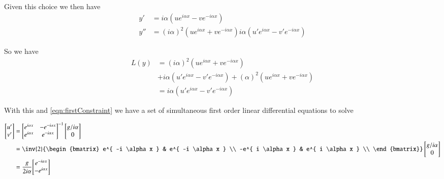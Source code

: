 \documentclass{article}
\begin{document}
Given this choice we then have
\begin{align*}
y' &= i \alpha (u e^{ i \alpha x } - v e^{ -i \alpha x }) \\
y'' &= 
(i \alpha)^2 (u e^{ i \alpha x } + v e^{ -i \alpha x }) 
i \alpha (u' e^{ i \alpha x } - v' e^{ -i \alpha x }) 
\end{align*}

So we have
\begin{align*}
L(y) 
&=
(i \alpha)^2 (u e^{ i \alpha x } + v e^{ -i \alpha x })  \\
&+i \alpha (u' e^{ i \alpha x } - v' e^{ -i \alpha x }) 
+ (\alpha)^2 (u e^{ i \alpha x } + v e^{ -i \alpha x })  \\
&=
i \alpha (u' e^{ i \alpha x } - v' e^{ -i \alpha x }) 
\end{align*}

With this and \ref{eqn:firstConstraint} we have a set of simultaneous first order linear differential equations to solve

\begin{align*}
\begin{bmatrix}
u' \\
v' \\
\end{bmatrix}
&=
{\begin{bmatrix}
 e^{ i \alpha x } &- e^{ -i \alpha x } \\
 e^{ i \alpha x } &  e^{ -i \alpha x } \\
\end{bmatrix}}^{-1}
\begin{bmatrix}
{g}/{i \alpha} \\
0 \\
\end{bmatrix} \\
&=
\inv{2}
{\begin{bmatrix}
 e^{ -i \alpha x } & e^{ -i \alpha x } \\
 -e^{ i \alpha x } &  e^{ i \alpha x } \\
\end{bmatrix}}
\begin{bmatrix}
{g}/{i \alpha} \\
0 \\
\end{bmatrix} \\
&=
\frac{g}{2 i \alpha} 
{\begin{bmatrix}
 e^{ -i \alpha x } \\
 -e^{ i \alpha x } \\
\end{bmatrix}}
\end{align*}
\end{document}
